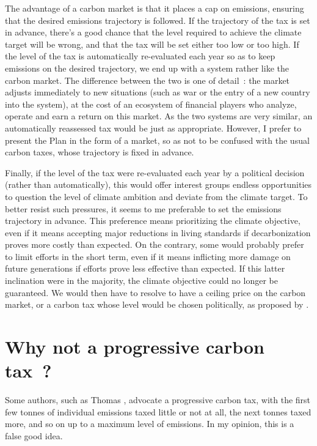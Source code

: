 \documentclass[a5paper,french,openany]{memoir}
\begin{document}
{The advantage of a carbon market is that it places a cap on emissions, ensuring that the desired emissions trajectory is followed. If the trajectory of the tax is set in advance, there's a good chance that the level required to achieve the climate target will be wrong, and that the tax will be set either too low or too high. If the level of the tax is automatically re-evaluated each year so as to keep emissions on the desired trajectory, we end up with a system rather like the carbon market. The difference between the two is one of detail~: the market adjusts immediately to new situations (such as war or the entry of a new country into the system), at the cost of an ecosystem of financial players who analyze, operate and earn a return on this market. As the two systems are very similar, an automatically reassessed tax would be just as appropriate. However, I prefer to present the Plan in the form of a market, so as not to be confused with the usual carbon taxes, whose trajectory is fixed in advance. 

Finally, if the level of the tax were re-evaluated each year by a political decision (rather than automatically), this would offer interest groups endless opportunities to question the level of climate ambition and deviate from the climate target. To better resist such pressures, it seems to me preferable to set the emissions trajectory in advance. This preference means prioritizing the climate objective, even if it means accepting major reductions in living standards if decarbonization proves more costly than expected. 
On the contrary, some would probably prefer to limit efforts in the short term, even if it means inflicting more damage on future generations if efforts prove less effective than expected. If this latter inclination were in the majority, the climate objective could no longer be guaranteed. We would then have to resolve to have a ceiling price on the carbon market, or a carbon tax whose level would be chosen politically, as proposed by \cite{weitzman_world_2017}. 

\section*{\normalsize Why not a progressive carbon tax~?}\label{q:taxe_progressive}

Some authors, such as Thomas \cite{piketty_capital_2019}, advocate a progressive carbon tax, with the first few tonnes of individual emissions taxed little or not at all, the next tonnes taxed more, and so on up to a maximum level of emissions. In my opinion, this is a false good idea. 

}
\end{document}
